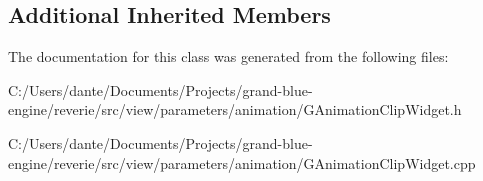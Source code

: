 \subsection*{Additional Inherited Members}


The documentation for this class was generated from the following files\+:\begin{DoxyCompactItemize}
\item 
C\+:/\+Users/dante/\+Documents/\+Projects/grand-\/blue-\/engine/reverie/src/view/parameters/animation/G\+Animation\+Clip\+Widget.\+h\item 
C\+:/\+Users/dante/\+Documents/\+Projects/grand-\/blue-\/engine/reverie/src/view/parameters/animation/G\+Animation\+Clip\+Widget.\+cpp\end{DoxyCompactItemize}
